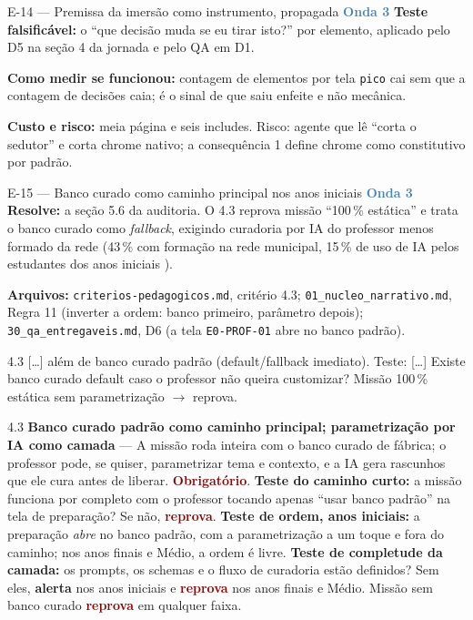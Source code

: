 \documentclass[11pt,a4paper]{article}
\newcommand{\obrig}{\textcolor{DarkRed}{\textbf{Obrigatório}}}
\newcommand{\rep}{\textcolor{DarkRed}{\textbf{reprova}}}
\newcommand{\alerta}{\textcolor{DarkYellow}{\textbf{alerta}}}
\newcommand{\onda}[1]{\textcolor{SteelBlue}{\textbf{Onda #1}}}
\begin{document}
\begin{emendabox}{E-14 --- Premissa da imersão como instrumento, propagada \hfill \onda{3}}
\textbf{Teste falsificável:} o ``que decisão muda se eu tirar isto?'' por elemento, aplicado pelo
D5 na seção 4 da jornada e pelo QA em D1.

\textbf{Como medir se funcionou:} contagem de elementos por tela \texttt{pico} cai sem que a
contagem de decisões caia; é o sinal de que saiu enfeite e não mecânica.

\textbf{Custo e risco:} meia página e seis includes. Risco: agente que lê ``corta o sedutor'' e
corta chrome nativo; a consequência 1 define chrome como constitutivo por padrão.
\end{emendabox}

\begin{emendabox}{E-15 --- Banco curado como caminho principal nos anos iniciais \hfill \onda{3}}
\textbf{Resolve:} a seção 5.6 da auditoria. O 4.3 reprova missão ``100\,\% estática'' e trata o
banco curado como \emph{fallback}, exigindo curadoria por IA do professor menos formado da rede
(43\,\% com formação na rede municipal, 15\,\% de uso de IA pelos estudantes dos anos iniciais
\cite{ticedu2024}).

\textbf{Arquivos:} \texttt{criterios-pedagogicos.md}, critério 4.3; \texttt{01\_nucleo\_narrativo.md},
Regra 11 (inverter a ordem: banco primeiro, parâmetro depois); \texttt{30\_qa\_entregaveis.md}, D6
(a tela \texttt{E0-PROF-01} abre no banco padrão).

\begin{antesbox}\small
4.3 [\dots] além de banco curado padrão (default/fallback imediato). Teste: [\dots] Existe banco
curado default caso o professor não queira customizar? Missão 100\,\% estática sem parametrização
$\to$ reprova.
\end{antesbox}

\begin{depoisbox}\small
4.3 \textbf{Banco curado padrão como caminho principal; parametrização por IA como camada} ---
A missão roda inteira com o banco curado de fábrica; o professor pode, se quiser, parametrizar
tema e contexto, e a IA gera rascunhos que ele cura antes de liberar. \obrig{}.
\textbf{Teste do caminho curto:} a missão funciona por completo com o professor tocando apenas
``usar banco padrão'' na tela de preparação? Se não, \rep. \textbf{Teste de ordem, anos
iniciais:} a preparação \emph{abre} no banco padrão, com a parametrização a um toque e fora do
caminho; nos anos finais e Médio, a ordem é livre. \textbf{Teste de completude da camada:} os
prompts, os schemas e o fluxo de curadoria estão definidos? Sem eles, \alerta{} nos anos iniciais e
\rep{} nos anos finais e Médio. Missão sem banco curado \rep{} em qualquer faixa.
\end{depoisbox}


\end{emendabox}
\end{document}
